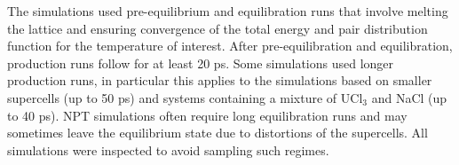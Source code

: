 \documentclass[titlepage=firstiscover,11pt,fleqn,headheight=14pt,footheight=40.8pt]{scrreprt}
\begin{document}
The simulations used pre-equilibrium and equilibration runs that involve melting the lattice and ensuring convergence of the total energy and pair distribution function for the temperature of interest. After pre-equilibration and equilibration, production runs follow for at least 20 ps. Some simulations used longer production runs, in particular this applies to the simulations based on smaller supercells (up to 50 ps) and systems containing a mixture of UCl$_3$ and NaCl (up to 40 ps). NPT simulations often require long equilibration runs and may sometimes leave the equilibrium state due to distortions of the supercells. All simulations were inspected to avoid sampling such regimes.  %
\end{document}
